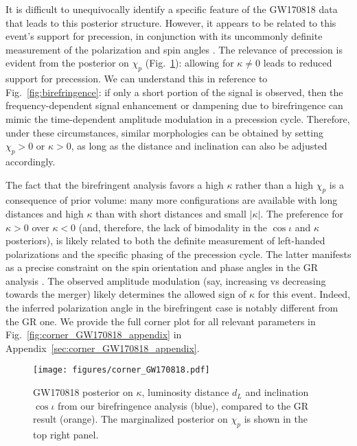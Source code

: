 \documentclass[aps,prd,twocolumn,superscriptaddress,preprintnumbers,floatfix,nofootinbib]{revtex4-2}
\begin{document}
It is difficult to unequivocally identify a specific feature of the GW170818 data that leads to this posterior structure.
However, it appears to be related to this event's support for precession, in conjunction with its uncommonly definite measurement of the polarization and spin angles \cite{Varma:2021csh}.
The relevance of precession is evident from the posterior on $\chi_p$ (Fig.~\ref{fig:corner_GW170818}): allowing for $\kappa \neq 0$ leads to reduced support for precession.
We can understand this in reference to Fig.~\ref{fig:birefringence}: if only a short portion of the signal is observed, then the frequency-dependent signal enhancement or dampening due to birefringence can mimic the time-dependent amplitude modulation in a precession cycle.
Therefore, under these circumstances, similar morphologies can be obtained by setting $\chi_p > 0$ or $\kappa > 0$, as long as the distance and inclination can also be adjusted accordingly.

The fact that the birefringent analysis favors a high $\kappa$ rather than a high $\chi_p$ is a consequence of prior volume: many more configurations are available with long distances and high $\kappa$ than with short distances and small $|\kappa|$.
The preference for $\kappa > 0$ over $\kappa < 0$ (and, therefore, the lack of bimodality in the $\cos\iota$ and $\kappa$ posteriors), is likely related to both the definite measurement of left-handed polarizations and the specific phasing of the precession cycle.
The latter manifests as a precise constraint on the spin orientation and phase angles in the \ac{GR} analysis \cite{Varma:2021csh}.
The observed amplitude modulation (say, increasing vs decreasing towards the merger) likely determines the allowed sign of $\kappa$ for this event.
Indeed, the inferred polarization angle in the birefringent case is notably different from the \ac{GR} one.
We provide the full corner plot for all relevant parameters in Fig.~\ref{fig:corner_GW170818_appendix} in Appendix~\ref{sec:corner_GW170818_appendix}.

\begin{figure}
    \texttt{[image: figures/corner\_GW170818.pdf]}
    \caption{
        GW170818 posterior on $\kappa$, luminosity distance $d_L$ and inclination $\cos\iota$ from our birefringence analysis (blue), compared to the GR result (orange).
        The marginalized posterior on $\chi_p$ is shown in the top right panel.
    }
    \label{fig:corner_GW170818}
\end{figure}
\end{document}
